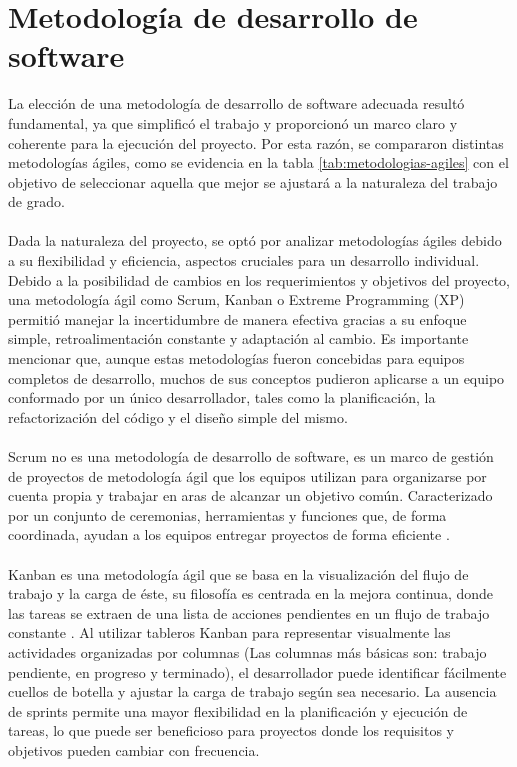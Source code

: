 \section{Metodología de desarrollo de software}
La elección de una metodología de desarrollo de software adecuada resultó fundamental,
ya que simplificó el trabajo y proporcionó un marco claro y coherente para la ejecución del proyecto. Por esta razón, se compararon distintas metodologías ágiles, como se evidencia en la tabla \ref{tab:metodologias-agiles} con el objetivo de seleccionar aquella que mejor se ajustará a la naturaleza del trabajo de grado.
\\ 
\\
Dada la naturaleza del proyecto, se optó por analizar metodologías ágiles debido a su flexibilidad y eficiencia, aspectos cruciales para un desarrollo individual. Debido a la posibilidad de cambios en los requerimientos y objetivos del proyecto, una metodología ágil como Scrum, Kanban o Extreme Programming (XP) permitió manejar la incertidumbre de manera efectiva gracias a su enfoque simple, retroalimentación constante y adaptación al cambio. Es importante mencionar que, aunque estas metodologías fueron concebidas para equipos completos de desarrollo, muchos de sus conceptos pudieron aplicarse a un equipo conformado por un único desarrollador, tales como la planificación, la refactorización del código y el diseño simple del mismo.
\\
\\
Scrum no es una metodología de desarrollo de software, es un marco de gestión de proyectos de metodología ágil que los equipos utilizan para organizarse por cuenta propia y trabajar en aras de alcanzar un objetivo común. Caracterizado por un conjunto de ceremonias, herramientas y funciones que, de forma coordinada, ayudan a los equipos entregar proyectos de forma eficiente \cite{Amazon2024}.
\\
\\
Kanban es una metodología ágil que se basa en la visualización del flujo de trabajo y la carga de éste, su filosofía es centrada en la mejora continua, donde las tareas se extraen de una lista de acciones pendientes en un flujo de trabajo constante \cite{Martins2024}. Al utilizar tableros Kanban para representar visualmente las actividades organizadas por columnas (Las columnas más básicas son: trabajo pendiente, en progreso y terminado), el desarrollador puede identificar fácilmente cuellos de botella y ajustar la carga de trabajo según sea necesario. La ausencia de sprints permite una mayor flexibilidad en la planificación y ejecución de tareas, lo que puede ser beneficioso para proyectos donde los requisitos y objetivos pueden cambiar con frecuencia.
